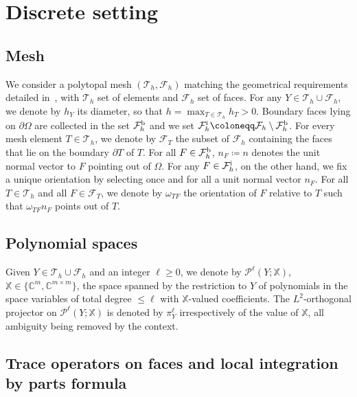\documentclass[11pt,a4paper]{article}
\theoremstyle{plain}
\theoremstyle{remark}
\theoremstyle{definition}
\newcommand{\Complex}{\mathbb{C}}
\newcommand{\Th}{\mathcal{T}_h}
\newcommand{\Fh}{\mathcal{F}_h}
\newcommand{\Fhb}{\mathcal{F}_h^{\rm b}}
\newcommand{\Fhi}{\mathcal{F}_h^{\rm i}}
\newcommand{\FT}{\mathcal{F}_T}
\newcommand{\Poly}[1]{\mathcal{P}^{#1}}
\newcommand{\lproj}[2]{\pi^{#1}_{#2}}
\begin{document}

\section{Discrete setting}\label{sec:discrete.setting}

\subsection{Mesh}

We consider a polytopal mesh $(\Th,\Fh)$ matching the geometrical requirements detailed in~\cite[Definition 1.4]{Di-Pietro.Droniou:20}, with $\Th$ set of elements and $\Fh$ set of faces.
For any $Y \in \Th \cup \Fh$, we denote by $h_Y$ its diameter, so that $h=\max_{T\in\Th}h_T>0$.
%
Boundary faces lying on $\partial\Omega$  are collected in the set $\Fhb$ and we set $\Fhi \coloneqq \Fh \setminus \Fhb$.
For every mesh element $T\in\Th$, we denote by $\FT$ the subset of $\Fh$ containing the faces that lie on the boundary $\partial T$ of $T$.
For all $F \in \Fhb$, $n_F \coloneqq n$ denotes the unit normal vector to $F$ pointing out of $\Omega$.
For any $F \in \Fhi$, on the other hand, we fix a unique orientation by selecting once and for all a unit normal vector $n_F$.
For all $T \in \Th$ and all $F \in \FT$, we denote by $\omega_{TF}$ the orientation of $F$ relative to $T$ such that $\omega_{TF} n_F$ points out of $T$.

\subsection{Polynomial spaces}

Given $Y \in \Th \cup \Fh$ and an integer $\ell \ge 0$, we denote by $\Poly{\ell}(Y;\mathbb{X})$, $\mathbb{X} \in \{ \Complex^m, \Complex^{m\times m} \}$, the space spanned by the restriction to $Y$ of polynomials in the space variables of total degree $\le \ell$ with $\mathbb{X}$-valued coefficients.
The $L^2$-orthogonal projector on $\Poly{\ell}(Y;\mathbb{X})$ is denoted by $\lproj{\ell}{Y}$ irrespectively of the value of $\mathbb{X}$, all ambiguity being removed by the context.

\subsection{Trace operators on faces and local integration by parts formula}
\end{document}
